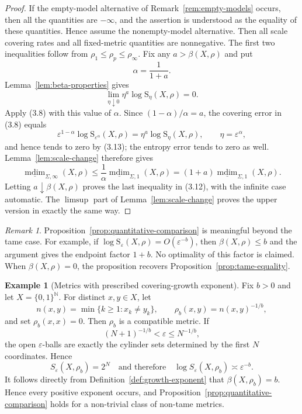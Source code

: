 \documentclass[12pt]{amsart}
\theoremstyle{definition}
\newtheorem{example}[theorem]{Example}
\theoremstyle{remark}
\newtheorem{remark}[theorem]{Remark}
\newcommand{\mdim}{\operatorname{mdim}}
\newcommand{\N}{\mathbb N}
\begin{document}
\begin{proof}
If the empty-model alternative of Remark~\ref{rem:empty-models} occurs,
then all the quantities are $-\infty$, and the assertion is understood
as the equality of these quantities. Hence assume the nonempty-model
alternative. Then all scale covering rates and all fixed-metric
quantities are nonnegative.
The first two inequalities follow from
$\rho_1\leq\rho_p\leq\rho_\infty$. Fix any
$a>\beta(X,\rho)$ and put
\[
 \alpha=\frac1{1+a}.
\]
Lemma~\ref{lem:beta-properties} gives
\[
 \lim_{\eta\downarrow0}\eta^a\log \mathrm{S}_\eta(X,\rho)=0.
 \tag{3.13}
\]
Apply (3.8) with this value of $\alpha$. Since
$(1-\alpha)/\alpha=a$, the covering error in (3.8) equals
\[
 \varepsilon^{1-\alpha}
 \log \mathrm{S}_{\varepsilon^\alpha}(X,\rho)
 =\eta^a\log \mathrm{S}_\eta(X,\rho),
 \qquad \eta=\varepsilon^\alpha,
\]
and hence tends to zero by (3.13); the entropy error tends to zero as well. Lemma~\ref{lem:scale-change} therefore gives
\[
 \underline{\mdim}_{\Sigma,\infty}(X,\rho)
 \leq\frac1\alpha\underline{\mdim}_{\Sigma,1}(X,\rho)
 =(1+a)\underline{\mdim}_{\Sigma,1}(X,\rho).
\]
Letting $a\downarrow\beta(X,\rho)$ proves the last inequality in (3.12), with the infinite case automatic. The $\limsup$ part of Lemma~\ref{lem:scale-change} proves the upper version in exactly the same way.
\end{proof}

\begin{remark}
Proposition~\ref{prop:quantitative-comparison} is meaningful beyond the
tame case. For example, if
$\log \mathrm{S}_\varepsilon(X,\rho)=O(\varepsilon^{-b})$, then
$\beta(X,\rho)\leq b$ and the argument gives the endpoint factor
$1+b$. No optimality of this factor is claimed. When $\beta(X,\rho)=0$, the proposition recovers
Proposition~\ref{prop:tame-equality}.
\end{remark}

\begin{example}[Metrics with prescribed covering-growth exponent]
\label{ex:prescribed-beta}
Fix $b>0$ and let $X=\{0,1\}^{\N}$. For distinct $x,y\in X$, let
\[
 n(x,y)=\min\{k\geq1:x_k\neq y_k\},
 \qquad
 \rho_b(x,y)=n(x,y)^{-1/b},
\]
and set $\rho_b(x,x)=0$. Then $\rho_b$ is a compatible metric. If
\[
 (N+1)^{-1/b}<\varepsilon\leq N^{-1/b},
\]
the open $\varepsilon$-balls are exactly the cylinder sets determined by the first $N$ coordinates. Hence
\[
 S_\varepsilon(X,\rho_b)=2^N
 \quad\text{and therefore}\quad
 \log S_\varepsilon(X,\rho_b)\asymp\varepsilon^{-b}.
\]
It follows directly from Definition~\ref{def:growth-exponent} that
$\beta(X,\rho_b)=b$. Hence every positive exponent occurs, and Proposition~\ref{prop:quantitative-comparison} holds for a non-trivial class of non-tame metrics.
\end{example}
\end{document}
